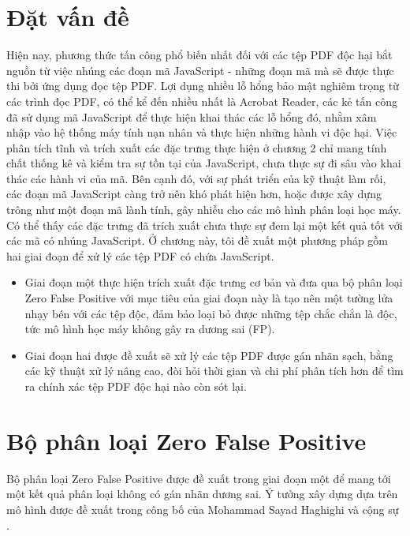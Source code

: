 \documentclass[./../main.tex]{subfiles}
\begin{document}
\section{Đặt vấn đề}
Hiện nay, phương thức tấn công phổ biến nhất đối với các tệp PDF độc hại bắt nguồn từ việc nhúng các đoạn mã JavaScript - những đoạn mã mà sẽ được thực thi bởi ứng dụng đọc tệp PDF. Lợi dụng nhiều lỗ hổng bảo mật nghiêm trọng từ các trình đọc PDF, có thể kể đến nhiều nhất là Acrobat Reader, các kẻ tấn công đã sử dụng mã JavaScript để thực hiện khai thác các lỗ hổng đó, nhằm xâm nhập vào hệ thống máy tính nạn nhân và thực hiện những hành vi độc hại. Việc phân tích tĩnh và trích xuất các đặc trưng thực hiện ở chương 2 chỉ mang tính chất thống kê và kiểm tra sự tồn tại của JavaScript, chưa thực sự đi sâu vào khai thác các hành vi của mã. Bên cạnh đó, với sự phát triển của kỹ thuật làm rối, các đoạn mã JavaScript càng trở nên khó phát hiện hơn, hoặc được xây dựng trông như một đoạn mã lành tính, gây nhiễu cho các mô hình phân loại học máy. Có thể thấy các đặc trưng đã trích xuất chưa thực sự đem lại một kết quả tốt với các mã có nhúng JavaScript.
Ở chương này, tôi đề xuất một phương pháp gồm hai giai đoạn để xử lý các tệp PDF có chứa JavaScript.
\begin{itemize}
	\item Giai đoạn một thực hiện trích xuất đặc trưng cơ bản và đưa qua bộ phân loại Zero False Positive với mục tiêu của giai đoạn này là tạo nên một tường lửa nhạy bén với các tệp độc, đảm bảo loại bỏ được những tệp chắc chắn là độc, tức mô hình học máy không gây ra dương sai (FP).
	\item Giai đoạn hai được đề xuất sẽ xử lý các tệp PDF được gán nhãn sạch, bằng các kỹ thuật xử lý nâng cao, đòi hỏi thời gian và chi phí phân tích hơn để tìm ra chính xác tệp PDF độc hại nào còn sót lại.
\end{itemize}

\section{Bộ phân loại Zero False Positive}
Bộ phân loại Zero False Positive được đề xuất trong giai đoạn một để mang tới một kết quả phân loại không có gán nhãn dương sai. Ý tưởng xây dựng dựa trên mô hình được đề xuất trong công bố của Mohammad Sayad Haghighi và cộng sự \cite{zfp}.
\end{document}
